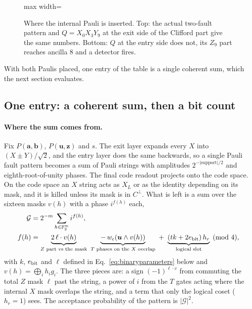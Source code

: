 \begin{figure}[H]\centering
\begin{adjustbox}{max width=\linewidth}\end{adjustbox}
\caption{Where the internal Pauli is inserted. Top: the actual two-fault pattern and $Q=X_0X_3Y_9$ at the exit side of the Clifford part give the same numbers. Bottom: $Q$ at the entry side does not, its $Z_9$ part reaches ancilla 8 and a detector fires.}
\label{fig:qposition}
\end{figure}

With both Paulis placed, one entry of the table is a single coherent sum, which the next section evaluates.

\subsection{One entry: a coherent sum, then a bit count}\label{app:B-entry}

\paragraph{Where the sum comes from.} Fix $P(\boldsymbol a,\boldsymbol b)$, $P(\boldsymbol u,\boldsymbol z)$ and $s$. The exit layer expands every $X$ into $(X\pm Y)/\sqrt2$, and the entry layer does the same backwards, so a single Pauli fault pattern becomes a sum of Pauli strings with amplitudes $2^{-|\mathrm{support}|/2}$ and eighth-root-of-unity phases. The final code readout projects onto the code space. On the code space an $X$ string acts as $X_L$ or as the identity depending on its mask, and it is killed unless its mask is in $C^\perp$. What is left is a sum over the sixteen masks $v(h)$ with a phase $i^{f(h)}$ each,
\begin{equation}
 \begin{aligned}
 {\cal G}&=2^{-m}\sum_{h\in\F^m}i^{f(h)},\\
 f(h)&=\underbrace{2\,\ell\cdot v(h)}_{\text{$Z$ part vs the mask}}\ \underbrace{-\,w_\epsilon(\boldsymbol u\wedge v(h))}_{\text{$T$ phases on the $X$ overlap}}\ +\ \underbrace{(tk+2e_{\rm bit})\,h_r}_{\text{logical slot}}\pmod 4 ,
 \end{aligned}
 \label{eq:gauss}
\end{equation}
with $k$, $e_{\rm bit}$ and $\ell$ defined in Eq.~\eqref{eq:binaryparameters} below and $v(h)=\bigoplus_ih_ig_i$. The three pieces are: a sign $(-1)^{\ell\cdot v}$ from commuting the total $Z$ mask $\ell$ past the string, a power of $i$ from the $T$ gates acting where the internal $X$ mask overlaps the string, and a term that only the logical coset ($h_r=1$) sees. The acceptance probability of the pattern is $|\mathcal G|^2$.

